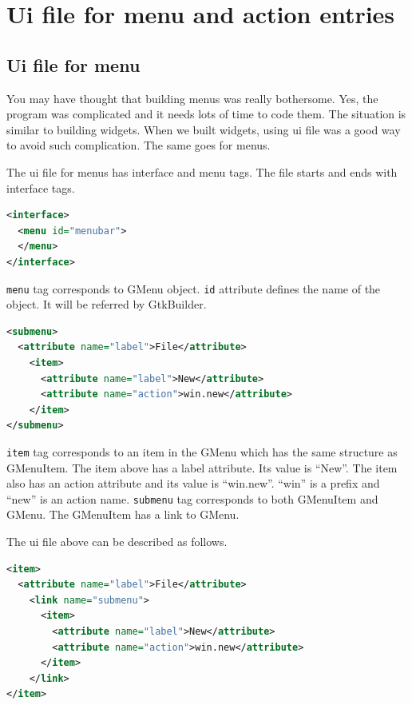 \section{Ui file for menu and action
entries}\label{ui-file-for-menu-and-action-entries}

\subsection{Ui file for menu}\label{ui-file-for-menu}

You may have thought that building menus was really bothersome. Yes, the
program was complicated and it needs lots of time to code them. The
situation is similar to building widgets. When we built widgets, using
ui file was a good way to avoid such complication. The same goes for
menus.

The ui file for menus has interface and menu tags. The file starts and
ends with interface tags.

\begin{lstlisting}[language=XML]
<interface>
  <menu id="menubar">
  </menu>
</interface>
\end{lstlisting}

\passthrough{\lstinline!menu!} tag corresponds to GMenu object.
\passthrough{\lstinline!id!} attribute defines the name of the object.
It will be referred by GtkBuilder.

\begin{lstlisting}[language=XML]
<submenu>
  <attribute name="label">File</attribute>
    <item>
      <attribute name="label">New</attribute>
      <attribute name="action">win.new</attribute>
    </item>
</submenu>
\end{lstlisting}

\passthrough{\lstinline!item!} tag corresponds to an item in the GMenu
which has the same structure as GMenuItem. The item above has a label
attribute. Its value is ``New''. The item also has an action attribute
and its value is ``win.new''. ``win'' is a prefix and ``new'' is an
action name. \passthrough{\lstinline!submenu!} tag corresponds to both
GMenuItem and GMenu. The GMenuItem has a link to GMenu.

The ui file above can be described as follows.

\begin{lstlisting}[language=XML]
<item>
  <attribute name="label">File</attribute>
    <link name="submenu">
      <item>
        <attribute name="label">New</attribute>
        <attribute name="action">win.new</attribute>
      </item>
    </link>
</item>
\end{lstlisting}

